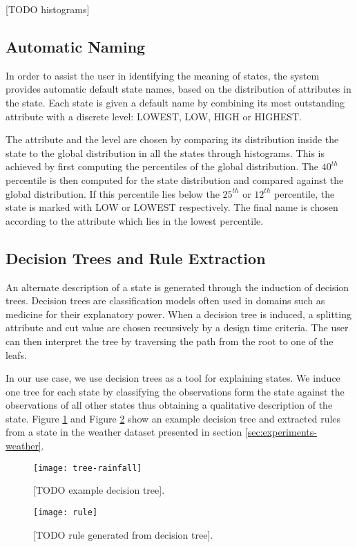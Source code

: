 [TODO histograms]

\subsection{Automatic Naming}

In order to assist the user in identifying the meaning of states, the system provides automatic default
state names, based on the distribution of attributes in the state. Each state is given a default name
by combining its most outstanding attribute with a discrete level: LOWEST, LOW, HIGH or
HIGHEST.

The attribute and the level are chosen by comparing its distribution inside the state to the global
distribution in all the states through histograms. This is achieved by first computing the percentiles
of the global distribution. The $40^{th}$ percentile is then computed for the state distribution and
compared against the global distribution. If this percentile lies below the $25^{th}$ or $12^{th}$
percentile, the state is marked with LOW or LOWEST respectively. The final name is chosen according
to the attribute which lies in the lowest percentile.


\subsection{Decision Trees and Rule Extraction}

An alternate description of a state is generated through the induction of decision trees. Decision
trees are classification models often used in domains such as medicine for their explanatory power.
When a decision tree is induced, a splitting attribute and cut value are chosen recursively by a
design time criteria. The user can then interpret the tree by traversing the path from the root 
to one of the leafs.

In our use case, we use decision trees as a tool for explaining states. We induce one tree for each
state by classifying the observations form the state against the observations of all other states
thus obtaining a qualitative description of the state. Figure \ref{fig:example-decision-tree} and
Figure \ref{fig:example-decision-tree-rule} show an example decision tree and extracted rules
from a state in the weather dataset presented in section \ref{sec:experiments-weather}.

\begin{figure}[h!]
	\centering
	\texttt{[image: tree-rainfall]}
	\caption{[TODO example decision tree].}
	\label{fig:example-decision-tree}
\end{figure}

\begin{figure}[h!]
	\centering
	\texttt{[image: rule]}
	\caption{[TODO rule generated from decision tree].}
	\label{fig:example-decision-tree-rule}
\end{figure}